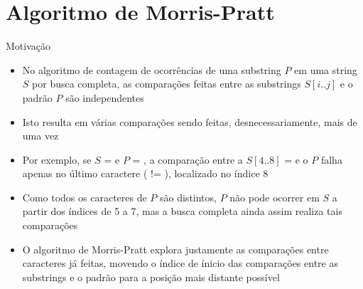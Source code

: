 \section{Algoritmo de Morris-Pratt}

\begin{frame}[fragile]{Motivação}

    \begin{itemize}
        \item No algoritmo de contagem de ocorrências de uma substring $P$ em uma string $S$ por
        busca completa, as comparações feitas entre as substrings $S[i..j]$ e o padrão $P$ 
        são independentes

        \item Isto resulta em várias comparações sendo feitas, desnecessariamente, mais de uma vez

        \item Por exemplo, se $S$ =  e $P$ = , a 
            comparação entre a $S[4..8]$ =  e o $P$ falha apenas no último 
            caractere ( != ), localizado no índice 8

        \item Como todos os caracteres de $P$ são distintos, $P$ não pode ocorrer em $S$ a partir 
            dos índices de 5 a 7, mas a busca completa ainda assim realiza tais comparações

        \item O algoritmo de Morris-Pratt explora justamente as comparações entre caracteres já 
            feitas, movendo o índice de ínicio das comparações entre as substrings e o padrão para 
            a posição mais distante possível

    \end{itemize}

\end{frame}

